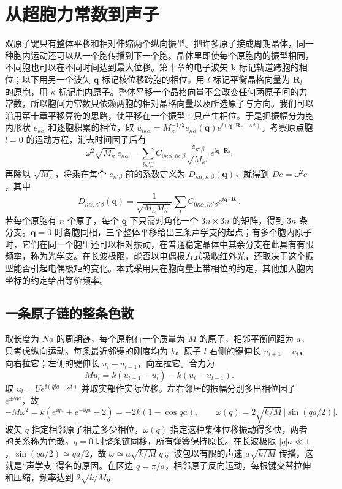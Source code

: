 \section{从超胞力常数到声子}
双原子键只有整体平移和相对伸缩两个纵向振型。把许多原子接成周期晶体，同一种胞内运动还可以从一个胞传播到下一个胞。晶体里即使每个原胞内的振型相同，不同胞也可以在不同时间达到最大位移。第十章的电子波矢 $\bm k$ 标记轨道跨胞的相位；以下用另一个波矢 $\bm q$ 标记核位移跨胞的相位。用 $l$ 标记平衡晶格向量为 $\bm R_l$ 的原胞，用 $\kappa$ 标记胞内原子。整体平移一个晶格向量不会改变任何两原子间的力常数，所以胞间力常数只依赖两胞的相对晶格向量以及所选原子与方向。我们可以沿用第十章平移算符的思路，使平移在一个振型上只产生相位。于是把振幅分为胞内形状 $e_{\kappa\alpha}$ 和逐胞积累的相位，取 $u_{l\kappa\alpha}=M_\kappa^{-1/2}e_{\kappa\alpha}(\bm q)e^{\ii(\bm q\cdot\bm R_l-\omega t)}$。考察原点胞 $l=0$ 的运动方程，消去时间因子后有
\begin{equation}
\omega^2\sqrt{M_\kappa}\,e_{\kappa\alpha}
=\sum_{l\kappa'\beta}C_{0\kappa\alpha,l\kappa'\beta}
\frac{e_{\kappa'\beta}}{\sqrt{M_{\kappa'}}}e^{\ii\bm q\cdot\bm R_l}.
\end{equation}
再除以 $\sqrt{M_\kappa}$，将乘在每个 $e_{\kappa'\beta}$ 前的系数定义为 $D_{\kappa\alpha,\kappa'\beta}(\bm q)$，就得到 $De=\omega^2e$，其中
\begin{equation}
D_{\kappa\alpha,\kappa'\beta}(\bm q)=\frac1{\sqrt{M_\kappa M_{\kappa'}}}\sum_l C_{0\kappa\alpha,l\kappa'\beta}e^{\ii\bm q\cdot\bm R_l}.
\end{equation}
若每个原胞有 $n$ 个原子，每个 $\bm q$ 下只需对角化一个 $3n\times3n$ 的矩阵，得到 $3n$ 条分支。$\bm q=0$ 时各胞同相，三个整体平移给出三条声学支的起点；有多个胞内原子时，它们在同一个胞里还可以相对振动，在普通稳定晶体中其余分支在此具有有限频率，称为光学支。在长波极限，能否以电偶极方式吸收红外光，还取决于这个振型能否引起电偶极矩的变化。本式采用只在胞向量上带相位的约定，其他加入胞内坐标的约定给出等价频率。

\subsection{一条原子链的整条色散}
取长度为 $Na$ 的周期链，每个原胞有一个质量为 $M$ 的原子，相邻平衡间距为 $a$，只考虑纵向运动。每条最近邻键的刚度均为 $k$。原子 $l$ 右侧的键伸长 $u_{l+1}-u_l$，向右拉它；左侧的键伸长 $u_l-u_{l-1}$，向左拉它。合力为
\[
 M\ddot u_l=k(u_{l+1}-u_l)-k(u_l-u_{l-1}).
\]
取 $u_l=Ue^{\ii(qla-\omega t)}$ 并取实部作实际位移。左右邻居的振幅分别多出相位因子 $e^{\pm\ii qa}$，故
\[
 -M\omega^2=k(e^{\ii qa}+e^{-\ii qa}-2)
 =-2k(1-\cos qa),\qquad
 \omega(q)=2\sqrt{k/M}\,|\sin(qa/2)|.
\]
波矢 $q$ 指定相邻原子相差多少相位，$\omega(q)$ 指定这种集体位移振动得多快，两者的关系称为色散。$q=0$ 时整条链同移，所有弹簧保持原长。在长波极限 $|q|a\ll1$，$\sin(qa/2)\simeq qa/2$，故 $\omega\simeq a\sqrt{k/M}|q|$。波包以有限的声速 $a\sqrt{k/M}$ 传播，这就是“声学支”得名的原因。在区边 $q=\pi/a$，相邻原子反向运动，每根键交替拉伸和压缩，频率达到 $2\sqrt{k/M}$。

